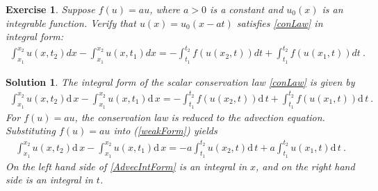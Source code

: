 \documentclass[10pt,letterpaper]{article}
\newcommand{\dif}[1][]{\mathrm{d} {#1}\,}
\newcommand{\frb}[1]{ \left(  {#1} \right) }
\theoremstyle{break}
\newtheorem{exercise}{Exercise}
\newtheorem{mysolution}{Solution}
\newenvironment{solution}{\begin{mysolution}}{\end{mysolution}}
\begin{document}
\begin{exercise}
	Suppose $f\!\left(u\right)=au$, where $a>0$ is a constant and $u_{0}\!\left(x\right)$ is an integrable function. Verify that $u(x)=u_{0}(x-at)$ satisfies \eqref{conLaw} in integral form:
	\begin{gather} \label{weakForm}
		\int_{x_{1}}^{x_{2}}u\!\left(x,t_{2}\right) dx
		-
		\int_{x_{1}}^{x_{2}}u\!\left(x,t_{1}\right)dx
		=
		-
		\int_{t_{1}}^{t_{2}}f\!\left(u\!\left(x_{2},t\right)\right)dt
		+
		\int_{t_{1}}^{t_{2}}f\!\left(u\!\left(x_{1},t\right)\right)dt 
		\ .
	\end{gather}%
\end{exercise}

\begin{solution}
	The integral form of the scalar conservation law \eqref{conLaw} is given by 
	\begin{gather} 
		\int_{x_{1}}^{x_{2}}u\frb{x,t_{2}} \dif x
				-\int_{x_{1}}^{x_{2}}u\frb{x,t_{1}} \dif x
			=-\int_{t_{1}}^{t_{2}}f\frb{u\frb{x_{2},t}} \dif t
				+\int_{t_{1}}^{t_{2}}f\frb{u\frb{x_{1},t}} \dif t\ .
	\end{gather}
	For $f(u)=au$, the conservation law is reduced to the advection equation. Substituting $f\!\left(u\right)=au$ into (\ref{weakForm}) yields
	\begin{gather} \label{AdvecIntForm}
		\int_{x_{1}}^{x_{2}}u\frb{x,t_{2}} \dif x
				-\int_{x_{1}}^{x_{2}}u\frb{x,t_{1}} \dif x
			=-a \int_{t_{1}}^{t_{2}} u\frb{x_{2},t} \dif t
				+a\int_{t_{1}}^{t_{2}} u\frb{x_{1},t} \dif t\  .
	\end{gather}
	On the left hand side of \eqref{AdvecIntForm} is an integral in $x$, and on the right hand side is an integral in $t$.
	

\end{solution}
\end{document}
